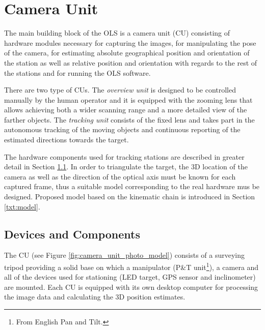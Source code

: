 \section{Camera Unit} \label{txt:camera_unit}

The main building block of the OLS is a camera unit (CU) consisting of hardware modules necessary for capturing the images, for manipulating the pose of the camera, for estimating absolute geographical position and orientation of the station as well as relative position and orientation with regards to the rest of the stations and for running the OLS software.

There are two type of CUs. The \textit{overview unit} is designed to be controlled manually by the human operator and it is equipped with the zooming lens that allows achieving both a wider scanning range and a more detailed view of the farther objects. The \textit{tracking unit} consists of the fixed lens and takes part in the autonomous tracking of the moving objects and continuous reporting of the estimated directions towards the target.

The hardware components used for tracking stations are described in greater detail in Section \ref{txt:devices}. In order to triangulate the target, the 3D location of the camera as well as the direction of the optical axis must be known for each captured frame, thus a suitable model corresponding to the real hardware mus be designed. Proposed model based on the kinematic chain is introduced in Section \ref{txt:model}.

\subsection{Devices and Components} \label{txt:devices}

The CU (see Figure \ref{fig:camera_unit_photo_model}) consists of a surveying tripod providing a solid base on which a manipulator (P\&T unit\footnote{From English Pan and Tilt.}), a camera and all of the devices used for stationing (LED target, GPS sensor and inclinometer) are mounted. Each CU is equipped with its own desktop computer for processing the image data and calculating the 3D position estimates.

